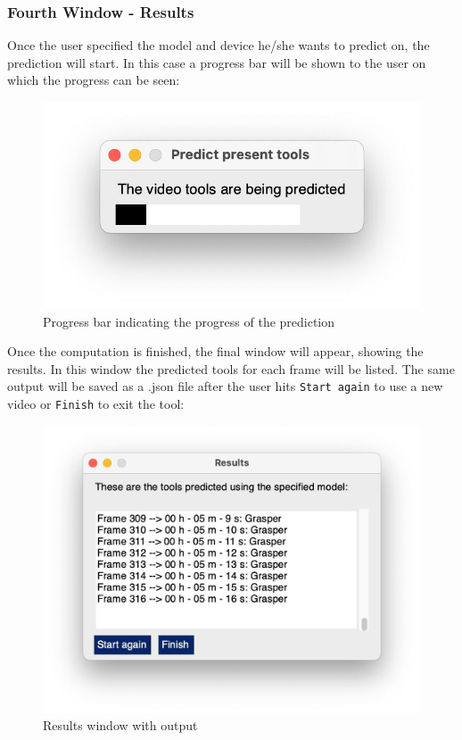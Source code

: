 \documentclass{article}
\begin{document}
\subsubsection{Fourth Window - Results}
Once the user specified the model and device he/she wants to predict on, the prediction will start. In this case a progress bar will be shown to the user on which the progress can be seen:

\begin{figure}[H]
    \centering
    \includegraphics[width = 0.5\linewidth]{Loading_window.jpg}
    \caption{Progress bar indicating the progress of the prediction}
\end{figure}
\noindent
Once the computation is finished, the final window will appear, showing the results. In this window the predicted tools for each frame will be listed. The same output will be saved as a .json file after the user hits \texttt{Start again} to use a new video or \texttt{Finish} to exit the tool:

\begin{figure}[H]
    \centering
    \includegraphics[width = 0.8\linewidth]{Results_window.jpg}
    \caption{Results window with output}
\end{figure}
\noindent
\end{document}
